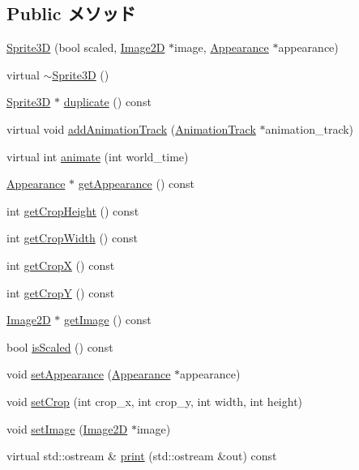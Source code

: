 \subsection*{Public メソッド}
\begin{CompactItemize}
\item 
\hyperlink{classm3g_1_1Sprite3D_9cb33fd453d441ed8e99b95f5e29df0c}{Sprite3D} (bool scaled, \hyperlink{classm3g_1_1Image2D}{Image2D} $\ast$image, \hyperlink{classm3g_1_1Appearance}{Appearance} $\ast$appearance)
\item 
virtual \hyperlink{classm3g_1_1Sprite3D_a57bd1e3141ba11c88ddec1e46c188d6}{$\sim$Sprite3D} ()
\item 
\hyperlink{classm3g_1_1Sprite3D}{Sprite3D} $\ast$ \hyperlink{classm3g_1_1Sprite3D_0af34e87be803eb476f9e118d2363246}{duplicate} () const 
\item 
virtual void \hyperlink{classm3g_1_1Sprite3D_415c0b110f95410ded9b85e5d99a496b}{addAnimationTrack} (\hyperlink{classm3g_1_1AnimationTrack}{AnimationTrack} $\ast$animation\_\-track)
\item 
virtual int \hyperlink{classm3g_1_1Sprite3D_8aad1ceab4c2a03609c8a42324ce484d}{animate} (int world\_\-time)
\item 
\hyperlink{classm3g_1_1Appearance}{Appearance} $\ast$ \hyperlink{classm3g_1_1Sprite3D_0219cb20ddea978a5796b5b414d012d2}{getAppearance} () const 
\item 
int \hyperlink{classm3g_1_1Sprite3D_d6d9d6f23b7bb004c93642bcd081f4a3}{getCropHeight} () const 
\item 
int \hyperlink{classm3g_1_1Sprite3D_5c6515f6706675ef31ca5dfa0a03b953}{getCropWidth} () const 
\item 
int \hyperlink{classm3g_1_1Sprite3D_d0ba0211183decc8f0459ca598b12912}{getCropX} () const 
\item 
int \hyperlink{classm3g_1_1Sprite3D_9ef03b219415a1f08aef6745ad5d87d0}{getCropY} () const 
\item 
\hyperlink{classm3g_1_1Image2D}{Image2D} $\ast$ \hyperlink{classm3g_1_1Sprite3D_a8c0193b0e7d47d4b5c9f60df24c44f5}{getImage} () const 
\item 
bool \hyperlink{classm3g_1_1Sprite3D_8e3e7fa70e1d3f2342580991105779f5}{isScaled} () const 
\item 
void \hyperlink{classm3g_1_1Sprite3D_b9b44bad4241635062ed66437c9bae48}{setAppearance} (\hyperlink{classm3g_1_1Appearance}{Appearance} $\ast$appearance)
\item 
void \hyperlink{classm3g_1_1Sprite3D_35ca6d3ff64f2232a0f3a11bf4ab483e}{setCrop} (int crop\_\-x, int crop\_\-y, int width, int height)
\item 
void \hyperlink{classm3g_1_1Sprite3D_705b89b41cd1b38f664ed912be44baaa}{setImage} (\hyperlink{classm3g_1_1Image2D}{Image2D} $\ast$image)
\item 
virtual std::ostream \& \hyperlink{classm3g_1_1Sprite3D_6fea17fa1532df3794f8cb39cb4f911f}{print} (std::ostream \&out) const 
\end{CompactItemize}
